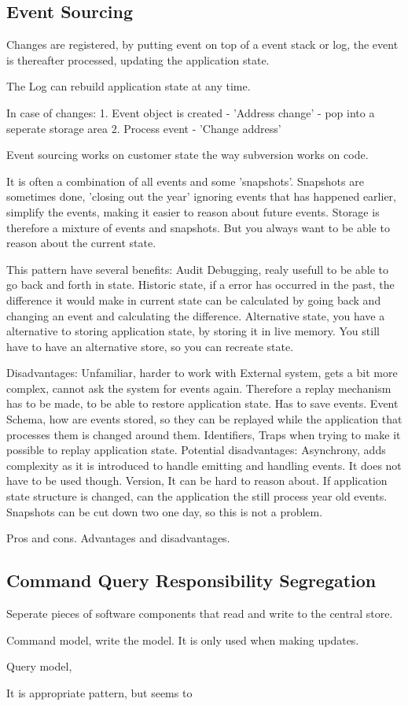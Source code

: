\subsection{Event Sourcing}
Changes are registered, by putting event on top of a event stack or log, the event is thereafter processed, updating the application state.

The Log can rebuild application state at any time.

In case of changes:
1. Event object is created - 'Address change' - pop into a seperate storage area
2. Process event - 'Change address'

Event sourcing works on customer state the way subversion works on code.

It is often a combination of all events and some 'snapshots'. Snapshots are sometimes done, 'closing out the year' ignoring events that has happened earlier, simplify the events, making it easier to reason about future events. Storage is therefore a mixture of events and snapshots. But you always want to be able to reason about the current state.

This pattern have several benefits:
Audit
Debugging, realy usefull to be able to go back and forth in state.
Historic state, if a error has occurred in the past, the difference it would make in current state can be calculated by going back and changing an event and calculating the difference.
Alternative state, you have a alternative to storing application state, by storing it in live memory. You still have to have an alternative store, so you can recreate state.

Disadvantages:
Unfamiliar, harder to work with
External system, gets a bit more complex, cannot ask the system for events again. Therefore a replay mechanism has to be made, to be able to restore application state. Has to save events.
Event Schema, how are events stored, so they can be replayed while the application that processes them is changed around them.
Identifiers, Traps when trying to make it possible to replay application state.
Potential disadvantages:
Asynchrony, adds complexity as it is introduced to handle emitting and handling events. It does not have to be used though.
Version, It can be hard to reason about. If application state structure is changed, can the application the still process year old events. Snapshots can be cut down two one day, so this is not a problem.

Pros and cons. Advantages and disadvantages.

\subsection{Command Query Responsibility Segregation}
Seperate pieces of software components that read and write to the central store.

Command model, write the model. It is only used when making updates.

Query model, 

It is appropriate pattern, but seems to 


